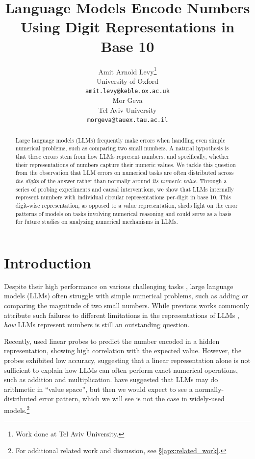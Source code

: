 \documentclass[11pt]{article}
\title{Language Models Encode Numbers Using Digit Representations in Base 10}
\author{Amit Arnold Levy\thanks{\hspace{3px}Work done at Tel Aviv University.} \\
  University of Oxford \\
  \texttt{amit.levy@keble.ox.ac.uk} \\\And
  Mor Geva \\
  Tel Aviv University \\
  \texttt{morgeva@tauex.tau.ac.il} \\}
\begin{document}
\maketitle

\begin{abstract}
Large language models (LLMs) frequently make errors when handling even simple numerical problems, such as comparing two small numbers. 
A natural hypothesis is that these errors stem from how LLMs represent numbers, and specifically, whether their representations of numbers capture their numeric values.
We tackle this question from the observation that LLM errors on numerical tasks are often distributed across \textit{the digits} of the answer rather than normally around \textit{its numeric value}. Through a series of probing experiments and causal interventions, we show that LLMs internally represent numbers with individual circular representations per-digit in base 10.
This digit-wise representation, as opposed to a value representation, sheds light on the error patterns of models on tasks involving numerical reasoning and could serve as a basis for future studies on analyzing numerical mechanisms in LLMs.
\end{abstract}


\section{Introduction}
Despite their high performance on various challenging tasks \citep{bubeck2023sparksartificialgeneralintelligence, bommasani2021opportunities, trinh2024solving}, large language models (LLMs) often struggle with simple numerical problems, such as adding or comparing the magnitude of two small numbers. 
While previous works commonly attribute such failures to different limitations in the representations of LLMs \citep[e.g.,][]{mcleish2024transformers, nogueira2021investigatinglimitationstransformerssimple}, \textit{how} LLMs represent numbers is still an outstanding question.

Recently, \citet{zhu2024languagemodelsknowvalue} used linear probes to predict the number encoded in a hidden representation, showing high correlation with the expected value. However, the probes exhibited low accuracy, suggesting that a linear representation alone is not sufficient to explain how LLMs can often perform exact numerical operations, such as addition and multiplication. \citet{Maltoni_2024} have suggested that LLMs may do arithmetic in ``value space'', but then we would expect to see a normally-distributed error pattern, which we will see is not the case in widely-used models.\footnote{For additional related work and discussion, see \S\ref{apx:related_work}.}
\end{document}
